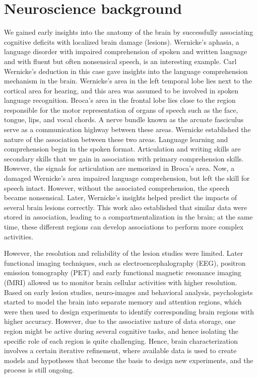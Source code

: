\documentclass[reprint,amsmath,amssymb,apr,aip,onecolumn, 11pt]{revtex4-1}
\begin{document}
\section{Neuroscience background}

We gained early insights into the anatomy of the brain by successfully associating cognitive deficits with localized brain damage (lesions). Wernicke's aphasia, a language disorder with impaired comprehension of spoken and written language and with fluent but often nonsensical speech, is an interesting example. Carl Wernicke's deduction in this case gave insights into the language comprehension mechanism in the brain. Wernicke's area in the left temporal lobe lies next to the cortical area for hearing, and this area was assumed to be involved in spoken language recognition. Broca's area in the frontal lobe lies close to the region responsible for the motor representation of organs of speech such as the face, tongue, lips, and vocal chords. A nerve bundle known as the arcuate fasciculus serve as a communication highway between these areas. Wernicke established the nature of the association between these two areas. Language learning and comprehension begin in the spoken format. Articulation and writing skills are secondary skills that we gain in association with primary comprehension skills. However, the signals for articulation are memorized in Broca's area. Now, a damaged Wernicke's area impaired language comprehension, but left the skill for speech intact. However, without the associated comprehension, the speech became nonsensical. Later, Wernicke's insights helped predict the impacts of several brain lesions correctly. This work also established that similar data were stored in association, leading to a compartmentalization in the brain; at the same time, these different regions can develop associations to perform more complex activities.  



However, the resolution and reliability of the lesion studies were limited. Later functional imaging techniques, such as electroencephalography (EEG), positron emission tomography (PET) and early functional magnetic resonance imaging (fMRI) allowed us to monitor brain cellular activities with higher resolution. Based on early lesion studies, neuro-images and behavioral analysis, psychologists started to model the brain into separate memory and attention regions, which were then used to design experiments to identify corresponding brain regions with higher accuracy. However,  due to the associative nature of data storage, one region might be active during several cognitive tasks, and hence isolating the specific role of each region is quite challenging. Hence, brain characterization involves a certain iterative refinement, where available data is used to create models and hypotheses that become the basis to design new experiments, and the process is still ongoing. 
\end{document}
